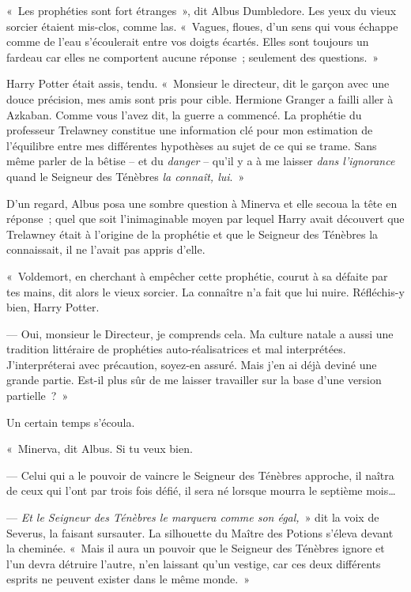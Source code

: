 «~Les prophéties sont fort étranges~», dit Albus Dumbledore. Les yeux du vieux sorcier étaient mis-clos, comme las. «~Vagues, floues, d'un sens qui vous échappe comme de l'eau s'écoulerait entre vos doigts écartés. Elles sont toujours un fardeau car elles ne comportent aucune réponse~; seulement des questions.~»

Harry Potter était assis, tendu. «~Monsieur le directeur, dit le garçon avec une douce précision, mes amis sont pris pour cible. Hermione Granger a failli aller à Azkaban. Comme vous l'avez dit, la guerre a commencé. La prophétie du professeur Trelawney constitue une information clé pour mon estimation de l'équilibre entre mes différentes hypothèses au sujet de ce qui se trame. Sans même parler de la bêtise -- et du \emph{danger} -- qu'il y a à me laisser \emph{dans l'ignorance} quand le Seigneur des Ténèbres \emph{la connaît, lui}.~»

D'un regard, Albus posa une sombre question à Minerva et elle secoua la tête en réponse~; quel que soit l'inimaginable moyen par lequel Harry avait découvert que Trelawney était à l'origine de la prophétie et que le Seigneur des Ténèbres la connaissait, il ne l'avait pas appris d'elle.

«~Voldemort, en cherchant à empêcher cette prophétie, courut à sa défaite par tes mains, dit alors le vieux sorcier. La connaître n'a fait que lui nuire. Réfléchis-y bien, Harry Potter.

--- Oui, monsieur le Directeur, je comprends cela. Ma culture natale a aussi une tradition littéraire de prophéties auto-réalisatrices et mal interprétées. J'interpréterai avec précaution, soyez-en assuré. Mais j'en ai déjà deviné une grande partie. Est-il plus sûr de me laisser travailler sur la base d'une version partielle~?~»

Un certain temps s'écoula.

«~Minerva, dit Albus. Si tu veux bien.

--- Celui qui a le pouvoir de vaincre le Seigneur des Ténèbres approche, il naîtra de ceux qui l'ont par trois fois défié, il sera né lorsque mourra le septième mois…

--- \emph{Et le Seigneur des Ténèbres le marquera comme son égal,}~» dit la voix de Severus, la faisant sursauter. La silhouette du Maître des Potions s'éleva devant la cheminée. «~Mais il aura un pouvoir que le Seigneur des Ténèbres ignore et l'un devra détruire l'autre, n'en laissant qu'un vestige, car ces deux différents esprits ne peuvent exister dans le même monde.~»

